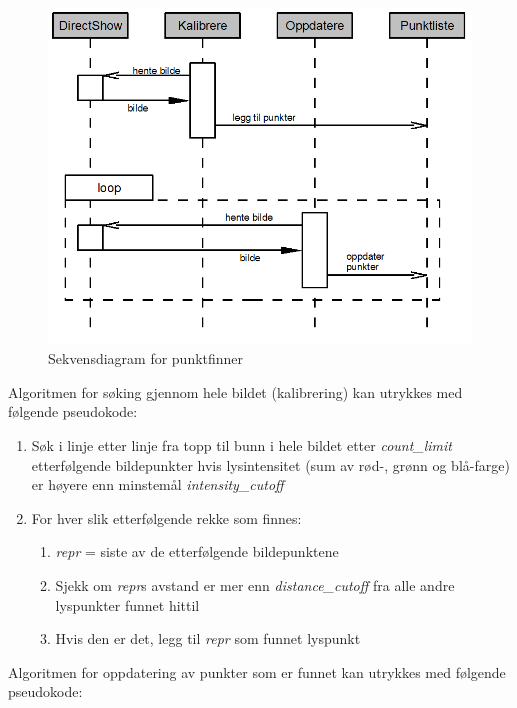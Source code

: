 		\begin{figure}[h]
		\centering
		\includegraphics[width=\textwidth]{graphics/pointfinder_sequence.png}
		\caption{Sekvensdiagram for punktfinner}
		\label{fig:pointfinder_sequence}
		\end{figure}
		
		Algoritmen for s\o king gjennom hele bildet (kalibrering) kan utrykkes med f\o lgende pseudokode:
		
		\begin{enumerate}
			\item S\o k i linje etter linje fra topp til bunn i hele bildet etter {\it count\_limit} etterf\o lgende bildepunkter hvis lysintensitet (sum av r\o d-, gr\o nn og bl\aa -farge) er h\o yere enn minstem\aa l {\it intensity\_cutoff}
			\item For hver slik etterf\o lgende rekke som finnes:
				\begin{enumerate}
					\item {\it repr} = siste av de etterf\o lgende bildepunktene
					\item Sjekk om {\it repr}s avstand er mer enn {\it distance\_cutoff} fra alle andre lyspunkter funnet hittil
					\item Hvis den er det, legg til {\it repr} som funnet lyspunkt
				\end{enumerate}
		\end{enumerate}
		
		Algoritmen for oppdatering av punkter som er funnet kan utrykkes med f\o lgende pseudokode:
		

